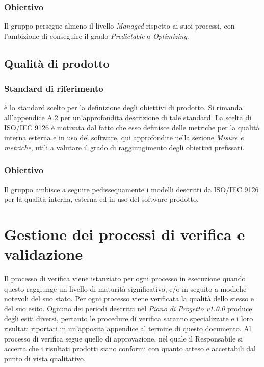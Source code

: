 \documentclass[openany,12pt,a4paper]{report}
\begin{document}
        \subsubsection{Obiettivo}
        
        Il gruppo persegue almeno il livello \textit{Managed} rispetto ai suoi processi, con l'ambizione di conseguire il grado \textit{Predictable} o \textit{Optimizing}.  
        
        \subsection{Qualità di prodotto}
        
        \subsubsection{Standard di riferimento}
        
         è lo standard scelto per la definizione degli obiettivi di prodotto. Si rimanda all'appendice A.2 per un'approfondita descrizione di tale standard.
        La scelta di ISO/IEC 9126 è motivata dal fatto che esso definisce delle metriche per la qualità interna esterna e in uso del software, qui approfondite nella sezione \textit{Misure e metriche}, utili a valutare il grado di raggiungimento degli obiettivi prefissati.
        
        \subsubsection{Obiettivo}
        
        Il gruppo ambisce a seguire pedissequamente i modelli descritti da ISO/IEC 9126 per la qualità interna, esterna ed in uso del software prodotto. 
    
    \section{Gestione dei processi di verifica e validazione}
        
    Il processo di verifica viene istanziato per ogni processo in esecuzione quando questo raggiunge un livello di maturità significativo, e/o in seguito a modiche notevoli del suo stato. Per ogni processo viene verificata la qualità dello stesso e del suo esito. 
    Ognuno dei periodi descritti nel \textit{Piano di Progetto v1.0.0} produce degli esiti diversi, pertanto le procedure di verifica saranno specializzate e i loro risultati riportati in un'apposita appendice al termine di questo documento. 
    Al processo di verifica segue quello di approvazione, nel quale il Responsabile si accerta che i risultati prodotti siano conformi con quanto atteso e accettabili dal punto di vista qualitativo.
\end{document}
